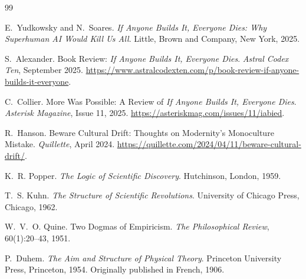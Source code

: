 \documentclass[11pt]{article}
\begin{document}
\begin{thebibliography}{99}

E.~Yudkowsky and N.~Soares.
\newblock \emph{If Anyone Builds It, Everyone Dies: Why Superhuman AI Would Kill Us All}.
\newblock Little, Brown and Company, New York, 2025.

S.~Alexander.
\newblock Book Review: \emph{If Anyone Builds It, Everyone Dies}.
\newblock \emph{Astral Codex Ten}, September 2025.
\newblock \url{https://www.astralcodexten.com/p/book-review-if-anyone-builds-it-everyone}.

C.~Collier.
\newblock More Was Possible: A Review of
\emph{If Anyone Builds It, Everyone Dies}.
\newblock \emph{Asterisk Magazine}, Issue 11, 2025.
\newblock \url{https://asteriskmag.com/issues/11/iabied}.

R.~Hanson.
\newblock Beware Cultural Drift: Thoughts on Modernity's Monoculture Mistake.
\newblock \emph{Quillette}, April 2024.
\newblock \url{https://quillette.com/2024/04/11/beware-cultural-drift/}.

K.~R. Popper.
\newblock \emph{The Logic of Scientific Discovery}.
\newblock Hutchinson, London, 1959.

T.~S. Kuhn.
\newblock \emph{The Structure of Scientific Revolutions}.
\newblock University of Chicago Press, Chicago, 1962.

W.~V.~O. Quine.
\newblock Two Dogmas of Empiricism.
\newblock \emph{The Philosophical Review}, 60(1):20--43, 1951.

P.~Duhem.
\newblock \emph{The Aim and Structure of Physical Theory}.
\newblock Princeton University Press, Princeton, 1954.
\newblock Originally published in French, 1906.

\end{thebibliography}
\end{document}
